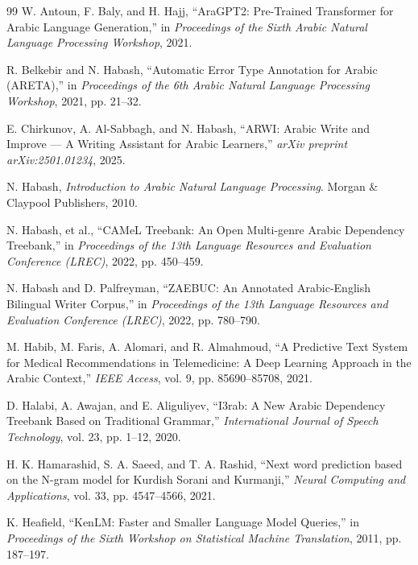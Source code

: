 \documentclass{article}
\begin{document}
\begin{thebibliography}{99}
W. Antoun, F. Baly, and H. Hajj,
``AraGPT2: Pre-Trained Transformer for Arabic Language Generation,''
in \textit{Proceedings of the Sixth Arabic Natural Language Processing Workshop}, 2021.

R. Belkebir and N. Habash, 
``Automatic Error Type Annotation for Arabic (ARETA),'' 
in \textit{Proceedings of the 6th Arabic Natural Language Processing Workshop}, 2021, pp. 21–32.

E. Chirkunov, A. Al-Sabbagh, and N. Habash, 
``ARWI: Arabic Write and Improve — A Writing Assistant for Arabic Learners,'' 
\textit{arXiv preprint arXiv:2501.01234}, 2025.

N. Habash, 
\textit{Introduction to Arabic Natural Language Processing}. 
Morgan & Claypool Publishers, 2010.

N. Habash, et al., 
``CAMeL Treebank: An Open Multi-genre Arabic Dependency Treebank,'' 
in \textit{Proceedings of the 13th Language Resources and Evaluation Conference (LREC)}, 2022, pp. 450–459.

N. Habash and D. Palfreyman, 
``ZAEBUC: An Annotated Arabic-English Bilingual Writer Corpus,'' 
in \textit{Proceedings of the 13th Language Resources and Evaluation Conference (LREC)}, 2022, pp. 780–790.

M. Habib, M. Faris, A. Alomari, and R. Almahmoud,
``A Predictive Text System for Medical Recommendations in Telemedicine: A Deep Learning Approach in the Arabic Context,''
\textit{IEEE Access}, vol. 9, pp. 85690–85708, 2021.

D. Halabi, A. Awajan, and E. Aliguliyev, 
``I3rab: A New Arabic Dependency Treebank Based on Traditional Grammar,'' 
\textit{International Journal of Speech Technology}, vol. 23, pp. 1–12, 2020.

H. K. Hamarashid, S. A. Saeed, and T. A. Rashid,
``Next word prediction based on the N-gram model for Kurdish Sorani and Kurmanji,''
\textit{Neural Computing and Applications}, vol. 33, pp. 4547–4566, 2021.

K. Heafield, 
``KenLM: Faster and Smaller Language Model Queries,'' 
in \textit{Proceedings of the Sixth Workshop on Statistical Machine Translation}, 2011, pp. 187–197.


\end{thebibliography}
\end{document}

